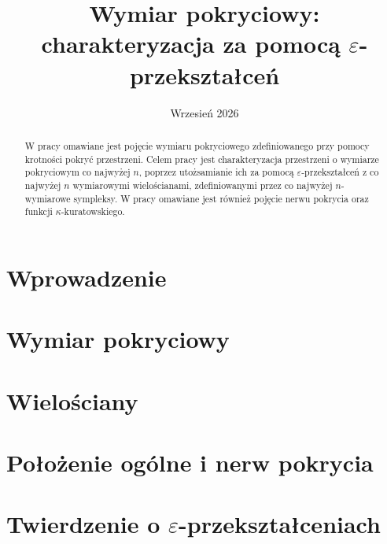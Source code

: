 \documentclass[licencjacka]{pracamgr}
\title{Wymiar pokryciowy: charakteryzacja za pomocą $\varepsilon$-przekształceń}
\date{Wrzesień 2026}
\theoremstyle{definition}
\begin{document}
\maketitle

\begin{abstract}
  W pracy omawiane jest pojęcie wymiaru pokryciowego zdefiniowanego przy pomocy krotności pokryć przestrzeni. Celem pracy jest charakteryzacja przestrzeni o wymiarze pokryciowym co najwyżej $n$, poprzez utożsamianie ich za pomocą $\varepsilon$-przekształceń z co najwyżej $n$ wymiarowymi wielościanami, zdefiniowanymi przez co najwyżej $n$-wymiarowe sympleksy. W pracy omawiane jest również pojęcie nerwu pokrycia oraz funkcji $\kappa$-kuratowskiego.
\end{abstract}

\tableofcontents

\chapter*{Wprowadzenie}


\chapter{Wymiar pokryciowy}


% 

\chapter{Wielościany}


\chapter{Położenie ogólne i nerw pokrycia}


\chapter{Twierdzenie o $\varepsilon$-przekształceniach}


\printbibliography





\end{document}

